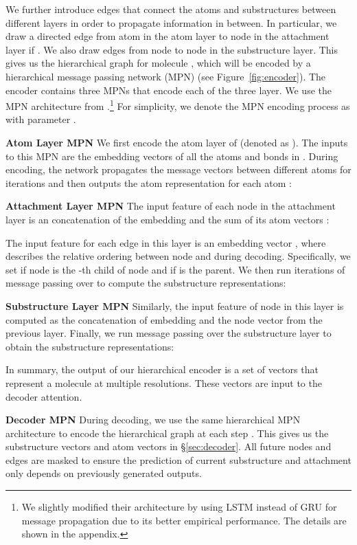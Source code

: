 \documentclass{article} \usepackage{iclr2020_conference,times}
\begin{document}
We further introduce edges that connect the atoms and substructures between different layers in order to propagate information in between. In particular, we draw a directed edge from atom  in the atom layer to node  in the attachment layer if . We also draw edges from node  to node  in the substructure layer. 
This gives us the hierarchical graph  for molecule , which will be encoded by a hierarchical message passing network (MPN) (see Figure~\ref{fig:encoder}). 
The encoder contains three MPNs that encode each of the three layer. We use the MPN architecture from \citet{jin2018learning}.\footnote{We slightly modified their architecture by using LSTM instead of GRU for message propagation due to its better empirical performance. The details are shown in the appendix.} For simplicity, we denote the MPN encoding process as  with parameter .

\textbf{Atom Layer MPN } 
We first encode the atom layer of  (denoted as ). The inputs to this MPN are the embedding vectors  of all the atoms and bonds in . During encoding, the network propagates the message vectors between different atoms for  iterations and then outputs the atom representation  for each atom :


\textbf{Attachment Layer MPN } 
The input feature of each node  in the attachment layer  is an concatenation of the embedding  and the sum of its atom vectors : 

The input feature for each edge  in this layer is an embedding vector , where  describes the relative ordering between node  and  during decoding. Specifically, we set  if node  is the -th child of node  and  if  is the parent. We then run  iterations of message passing over  to compute the substructure representations:


\textbf{Substructure Layer MPN } Similarly, the input feature of node  in this layer is computed as the concatenation of embedding  and the node vector  from the previous layer. Finally, we run message passing over the substructure layer  to obtain the substructure representations:

In summary, the output of our hierarchical encoder is a set of vectors  that represent a molecule  at multiple resolutions. These vectors are input to the decoder attention.

\textbf{Decoder MPN } During decoding, we use the same hierarchical MPN architecture to encode the hierarchical graph  at each step . This gives us the substructure vectors  and atom vectors  in \S\ref{sec:decoder}. All future nodes and edges are masked to ensure the prediction of current substructure and attachment only depends on previously generated outputs.
\end{document}
